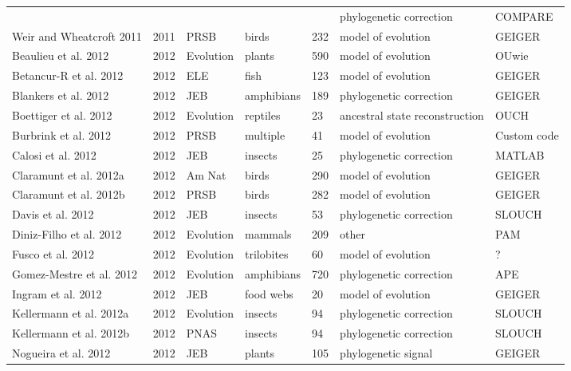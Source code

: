 \begin{landscape}
\begin{center}
\begin{longtable}{p{6cm}llllll}
    &       &       &       &       &   phylogenetic correction &   COMPARE \\
Weir and Wheatcroft 2011  &   2011    &   PRSB    &   birds   &   232 &   model of evolution  &   GEIGER  \\
Beaulieu et al. 2012  &   2012    &   Evolution   &   plants  &   590 &   model of evolution  &   OUwie   \\
Betancur-R et al. 2012    &   2012    &   ELE &   fish    &   123 &   model of evolution  &   GEIGER  \\
Blankers et al. 2012  &   2012    &   JEB &   amphibians  &   189 &   phylogenetic correction &   GEIGER  \\
Boettiger et al. 2012 &   2012    &   Evolution   &   reptiles    &   23  &   ancestral state reconstruction  &   OUCH    \\
Burbrink et al. 2012  &   2012    &   PRSB    &   multiple    &   41  &   model of evolution  &   Custom code \\
Calosi et al. 2012    &   2012    &   JEB &   insects &   25  &   phylogenetic correction &   MATLAB  \\
Claramunt et al. 2012a    &   2012    &   Am Nat  &   birds   &   290 &   model of evolution  &   GEIGER  \\
Claramunt et al. 2012b    &   2012    &   PRSB    &   birds   &   282 &   model of evolution  &   GEIGER  \\
Davis et al. 2012 &   2012    &   JEB &   insects &   53  &   phylogenetic correction &   SLOUCH  \\
Diniz-Filho et al. 2012   &   2012    &   Evolution   &   mammals &   209 &   other   &   PAM \\
Fusco et al. 2012 &   2012    &   Evolution   &   trilobites  &   60  &   model of evolution  &   ?   \\
Gomez-Mestre et al. 2012  &   2012    &   Evolution   &   amphibians  &   720 &   phylogenetic correction &   APE \\
Ingram et al. 2012    &   2012    &   JEB &   food webs   &   20  &   model of evolution  &   GEIGER  \\
Kellermann et al. 2012a   &   2012    &   Evolution   &   insects &   94  &   phylogenetic correction &   SLOUCH  \\
Kellermann et al. 2012b   &   2012    &   PNAS    &   insects &   94  &   phylogenetic correction &   SLOUCH  \\
Nogueira et al. 2012  &   2012    &   JEB &   plants  &   105 &   phylogenetic signal &   GEIGER  \\

\end{longtable}
\end{center}
\end{landscape}
